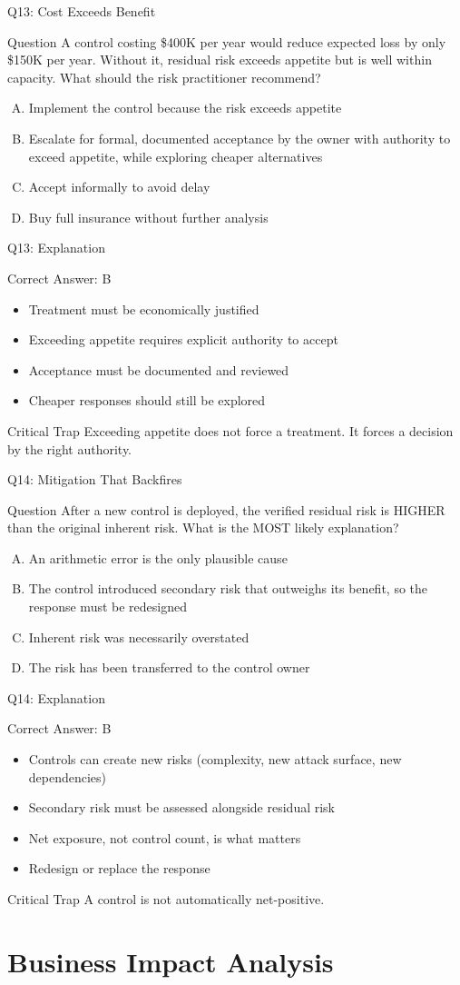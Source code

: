 \documentclass[aspectratio=169]{beamer}
\newcommand{\hq}[7]{%
  \begin{frame}{Q#1: #2}
    \begin{block}{Question}
      #3
    \end{block}
    \begin{enumerate}[(A)]
      #4
    \end{enumerate}
  \end{frame}
  \begin{frame}{Q#1: Explanation}
    \begin{block}{Correct Answer: #5}
      \begin{itemize}
        #6
      \end{itemize}
    \end{block}
    \begin{alertblock}{Critical Trap}
      #7
    \end{alertblock}
  \end{frame}
}
\begin{document}
\hq{13}{Cost Exceeds Benefit}
{A control costing \$400K per year would reduce expected loss by only \$150K per year. Without it, residual risk exceeds appetite but is well within capacity. What should the risk practitioner recommend?}
{\item Implement the control because the risk exceeds appetite
 \item Escalate for formal, documented acceptance by the owner with authority to exceed appetite, while exploring cheaper alternatives
 \item Accept informally to avoid delay
 \item Buy full insurance without further analysis}
{B}
{\item Treatment must be economically justified
 \item Exceeding appetite requires explicit authority to accept
 \item Acceptance must be documented and reviewed
 \item Cheaper responses should still be explored}
{Exceeding appetite does not force a treatment. It forces a decision by the right authority.}

\hq{14}{Mitigation That Backfires}
{After a new control is deployed, the verified residual risk is HIGHER than the original inherent risk. What is the MOST likely explanation?}
{\item An arithmetic error is the only plausible cause
 \item The control introduced secondary risk that outweighs its benefit, so the response must be redesigned
 \item Inherent risk was necessarily overstated
 \item The risk has been transferred to the control owner}
{B}
{\item Controls can create new risks (complexity, new attack surface, new dependencies)
 \item Secondary risk must be assessed alongside residual risk
 \item Net exposure, not control count, is what matters
 \item Redesign or replace the response}
{A control is not automatically net-positive.}

\section{Business Impact Analysis}
\end{document}
